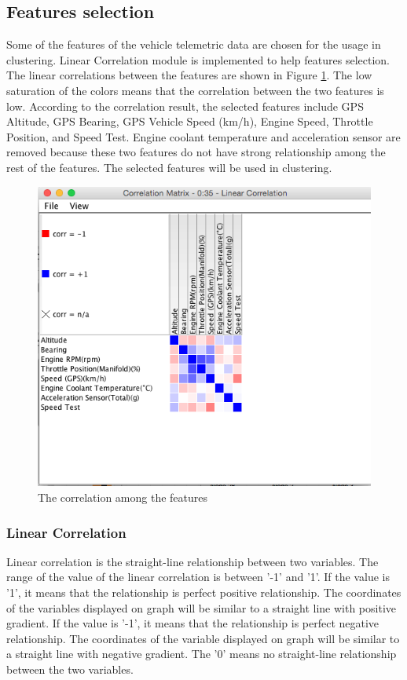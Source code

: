 \subsection{Features selection}
Some of the features of the vehicle telemetric data are chosen for the usage in clustering. Linear Correlation module is implemented to help features selection. The linear correlations between the features are shown in Figure \ref{fig:correlation}. The low saturation of the colors means that the correlation between the two features is low. According to the correlation result, the selected features include GPS Altitude, GPS Bearing, GPS Vehicle Speed (km/h), Engine Speed, Throttle Position, and Speed Test. Engine coolant temperature and acceleration sensor are removed because these two features do not have strong relationship among the rest of the features. The selected features will be used in clustering.

\begin{figure}[hbt!]\centering
\includegraphics[height=.5\textwidth]{image/KNIMEcorrelation}
\caption{The correlation among the features}
\label{fig:correlation}
\end{figure}

\subsubsection{Linear Correlation}
Linear correlation is the straight-line relationship between two variables. The range of the value of the linear correlation is between '-1' and '1'. If the value is '1', it means that the relationship is perfect positive relationship. The coordinates of the variables displayed on graph will be similar to a straight line with positive gradient. If the value is '-1', it means that the relationship is perfect negative relationship. The coordinates of the variable displayed on graph will be similar to a straight line with negative gradient. The '0' means no straight-line relationship between the two variables.

